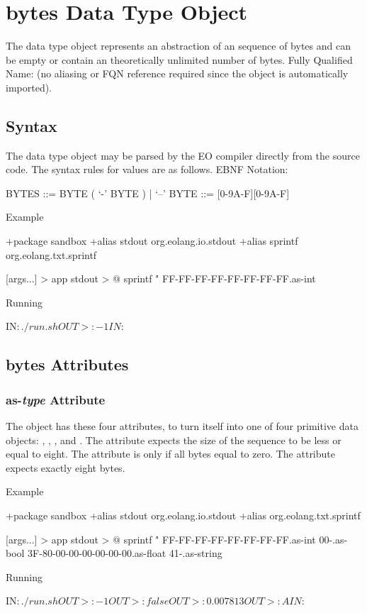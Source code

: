 \documentclass[12pt]{book}
\begin{document}
\section{bytes Data Type Object}
The  data type object represents an abstraction of an sequence of bytes and can be empty or contain an theoretically unlimited number of bytes.
Fully Qualified Name:  (no aliasing or FQN reference required since the object is automatically imported).

\subsection{Syntax}
The  data type object may be parsed by the EO compiler directly from the source code. The syntax rules for  values are as follows.
EBNF Notation:
\begin{ffcode}
    BYTES   ::= BYTE ( ‘-’ BYTE ) | ‘--’
    BYTE    ::= [0-9A-F][0-9A-F]
\end{ffcode}

Example
\begin{ffcode}
+package sandbox
+alias stdout org.eolang.io.stdout
+alias sprintf org.eolang.txt.sprintf

[args...] > app
  stdout > @
    sprintf
      "%
      FF-FF-FF-FF-FF-FF-FF-FF.as-int
    
Running

IN$: ./run.sh
OUT>: -1
IN$: 
\end{ffcode}

\subsection{bytes Attributes}

\subsubsection{as-\textit{type} Attribute}
The object  has these four attributes, to turn itself into one of four primitive data objects: , , , and .
The attribute  expects the size of the sequence to be less or equal to eight. The attribute  is  only if all bytes equal to zero. The attribute  expects exactly eight bytes.

Example
\begin{ffcode}
+package sandbox
+alias stdout org.eolang.io.stdout
+alias org.eolang.txt.sprintf

[args...] > app
  stdout > @
    sprintf
      "%
      FF-FF-FF-FF-FF-FF-FF-FF.as-int
      00-.as-bool
      3F-80-00-00-00-00-00-00.as-float
      41-.as-string
    
Running

IN$: ./run.sh
OUT>: -1
OUT>: false
OUT>: 0.007813
OUT>: A
IN$: 
\end{ffcode}
\end{document}

